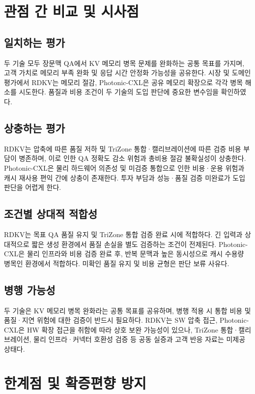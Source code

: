 \documentclass[11pt,a4paper]{article}
\begin{document}
\section{관점 간 비교 및 시사점}

\subsection{일치하는 평가}
두 기술 모두 장문맥 QA에서 KV 메모리 병목 문제를 완화하는 공통 목표를 가지며, 고객 가치로 메모리 부족 완화 및 응답 시간 안정화 가능성을 공유한다. 시장 및 도메인 평가에서 RDKV는 메모리 절감, Photonic-CXL은 공유 메모리 확장으로 각각 병목 해소를 시도한다. 품질과 비용 조건이 두 기술의 도입 판단에 중요한 변수임을 확인하였다.

\subsection{상충하는 평가}
RDKV는 압축에 따른 품질 저하 및 TriZone 통합·캘리브레이션에 따른 검증 비용 부담이 병존하며, 이로 인한 QA 정확도 감소 위험과 총비용 절감 불확실성이 상충한다. Photonic-CXL은 물리 하드웨어 의존성 및 미검증 통합으로 인한 비용·운용 위험과 캐시 재사용 편익 간에 상충이 존재한다. 투자 부담과 성능·품질 검증 미완료가 도입 판단을 어렵게 한다.

\subsection{조건별 상대적 적합성}
RDKV는 목표 QA 품질 유지 및 TriZone 통합 검증 완료 시에 적합하다. 긴 입력과 상대적으로 짧은 생성 환경에서 품질 손실을 별도 검증하는 조건이 전제된다. Photonic-CXL은 물리 인프라와 비용 검증 완료 후, 반복 문맥과 높은 동시성으로 캐시 수용량 병목인 환경에서 적합하다. 미확인 품질 유지 및 비용 균형은 판단 보류 사유다.

\subsection{병행 가능성}
두 기술은 KV 메모리 병목 완화라는 공통 목표를 공유하며, 병행 적용 시 통합 비용 및 품질·지연 위험에 대한 검증이 반드시 필요하다. RDKV는 SW 압축 접근, Photonic-CXL은 HW 확장 접근을 취함에 따라 상호 보완 가능성이 있으나, TriZone 통합·캘리브레이션, 물리 인프라·커넥터 호환성 검증 등 공동 실증과 고객 반응 자료는 미제공 상태다.

\section{한계점 및 확증편향 방지}
\end{document}
